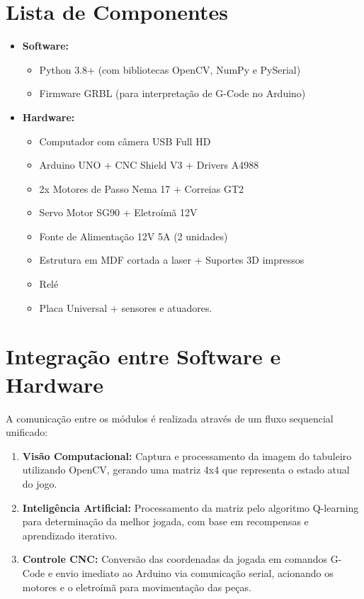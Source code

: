 \documentclass[a4paper,12pt]{article}
\begin{document}
\section{Lista de Componentes}  
\begin{itemize}  
    \item \textbf{Software:}  
    \begin{itemize}  
        \item Python 3.8+ (com bibliotecas OpenCV, NumPy e PySerial)  
        \item Firmware GRBL (para interpretação de G-Code no Arduino)  
    \end{itemize}  
    \item \textbf{Hardware:}  
    \begin{itemize}  
        \item Computador com câmera USB Full HD  
        \item Arduino UNO + CNC Shield V3 + Drivers A4988  
        \item 2x Motores de Passo Nema 17 + Correias GT2  
        \item Servo Motor SG90 + Eletroímã 12V  
        \item Fonte de Alimentação 12V 5A (2 unidades)  
        \item Estrutura em MDF cortada a laser + Suportes 3D impressos  
		\item Relé
		\item Placa Universal + sensores e atuadores.
    \end{itemize}  
\end{itemize}  

\section{Integração entre Software e Hardware}  
A comunicação entre os módulos é realizada através de um fluxo sequencial unificado:  
\begin{enumerate}  
    \item \textbf{Visão Computacional:} Captura e processamento da imagem do tabuleiro utilizando OpenCV, gerando uma matriz 4x4 que representa o estado atual do jogo.  
    \item \textbf{Inteligência Artificial:} Processamento da matriz pelo algoritmo Q-learning para determinação da melhor jogada, com base em recompensas e aprendizado iterativo.  
    \item \textbf{Controle CNC:} Conversão das coordenadas da jogada em comandos G-Code e envio imediato ao Arduino via comunicação serial, acionando os motores e o eletroímã para movimentação das peças.  
\end{enumerate}  
\end{document}
